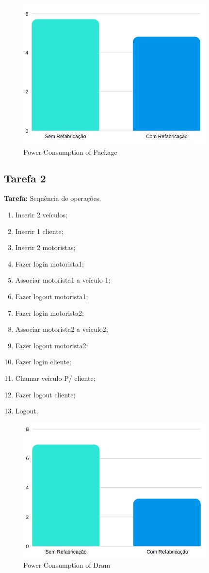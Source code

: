 \begin{figure}[H]
    \centering
    \includegraphics[scale=0.8]{tex/img/graficos/3.jpg}
    \caption{Power Consumption of Package}
\end{figure}


\subsection{Tarefa 2}
\textbf{Tarefa:} Sequência de operações.
\begin{enumerate}
    \setlength{\itemsep}{0pt}
    \setlength{\parskip}{0pt}
    \item Inserir 2 veículos;
    \item Inserir 1 cliente;
    \item Inserir 2 motoristas;
    \item Fazer login motorista1;
    \item Associar motorista1 a veículo 1;
    \item Fazer logout motorista1;
    \item Fazer login motorista2;
    \item Associar motorista2 a veiculo2;
    \item Fazer logout motorista2;
    \item Fazer login cliente;
    \item Chamar veiculo P/ cliente;
    \item Fazer logout cliente;
    \item Logout.
\end{enumerate}

\begin{figure}[H]
    \centering
    \includegraphics[scale=0.8]{tex/img/graficos/4.jpg}
    \caption{Power Consumption of Dram}
\end{figure}

